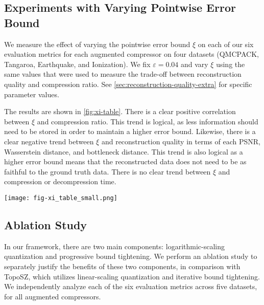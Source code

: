 \subsection{Experiments with Varying Pointwise Error Bound}
\label{sec:vary-xi}

We measure the effect of varying the pointwise error bound $\xi$ on each of our six evaluation metrics for each augmented compressor on four datasets (QMCPACK, Tangaroa, Earthquake, and Ionization). We fix $\varepsilon = 0.04$ and vary $\xi$ using the same values that were used to measure the trade-off between reconstruction quality and compression ratio. See \cref{sec:reconstruction-quality-extra} for specific parameter values.

The results are shown in \cref{fig:xi-table}. There is a clear positive correlation between $\xi$ and compression ratio. This trend is logical, as less information should need to be stored in order to maintain a higher error bound. Likewise, there is a clear negative trend between $\xi$ and reconstruction quality in terms of each PSNR, Wasserstein distance, and bottleneck distance. This trend is also logical as a higher error bound means that the reconstructed data does not need to be as faithful to the ground truth data. There is no clear trend between $\xi$ and compression or decompression time.

\begin{figure*}[]
    \texttt{[image: fig-xi\_table\_small.png]}
    \vspace{-6mm}
    \label{fig:xi-table}    
\end{figure*}

\subsection{Ablation Study}
\label{sec:ablation}

In our framework, there are two main components: logarithmic-scaling quantization and progressive bound tightening. We perform an ablation study to separately justify the benefits of these two components, in comparison with TopoSZ, which utilizes linear-scaling quantization and iterative bound tightening. 
We independently analyze each of the six evaluation metrics across five datasets, for all augmented compressors. 

